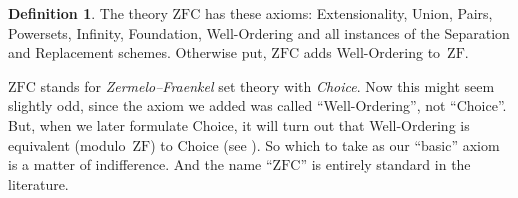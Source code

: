 \documentclass[10pt,a4paper]{article}
\makeatletter
\theoremstyle{plain}
\theoremstyle{definition}
\newtheorem{defn}[thm]{Definition}
\theoremstyle{remark}
\newcommand{\olref}{\@ifnextchar[{\olref@i}{\olref@final}}
\def\olref@i[#1]{\@ifnextchar[{\olref@ii}{\olref@final}}
\def\olref@ii[#1]{\@ifnextchar[{\olref@iii}{\olref@final}}
\def\olref@iii[#1]{\olref@final}
\def\olref@final#1{\ref{#1}}
\providecommand{\ZFC}{\mathrm{ZFC}}
\providecommand{\ZF}{\mathrm{ZF}}
\makeatother
\begin{document}
\begin{defn}
The theory $\ZFC$ has these axioms: Extensionality, Union, Pairs,
Powersets, Infinity, Foundation, Well-Ordering and all instances of
the Separation and Replacement schemes. Otherwise put, $\ZFC$ adds
Well-Ordering to~$\ZF$. 
\end{defn}

$\ZFC$ stands for \emph{Zermelo--Fraenkel} set theory with
\emph{Choice}. Now this might seem slightly odd, since the axiom we
added was called ``Well-Ordering'', not ``Choice''. But, when we later
formulate {Choice}, it will turn out that Well-Ordering is equivalent
(modulo~$\ZF$) to Choice (see \olref[choice][woproblem]{thmwochoice}).
So which to take as our ``basic'' axiom is a matter of indifference.
And the name ``$\ZFC$'' is entirely standard in the literature. 
\end{document}
